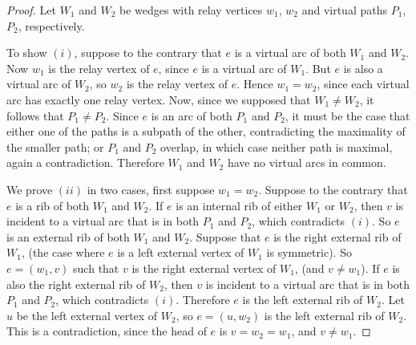 \documentclass[12pt,letterpaper,oneside]{book}
\begin{document}
\begin{proof} 

Let $W_1$ and $W_2$ be wedges with relay vertices $w_1$, $w_2$ 
and virtual paths $P_1$, $P_2$, respectively.   

To show $(i)$, suppose to the contrary that $e$ is a virtual arc of both $W_1$ and $W_2$.   
Now $w_1$ is the relay vertex of $e$, since $e$ is a virtual arc of $W_1$.  But 
$e$ is also a virtual arc of $W_2$, so $w_2$ is the relay vertex of $e$.  Hence $w_1 = w_2$, since 
each virtual arc has exactly one relay vertex.  Now, since we 
supposed that $W_1 \ne W_2$, it follows that $P_1 \ne P_2$.  Since $e$ is an arc of both $P_1$ and $P_2$, it must be the case that  
either one of the paths is a subpath of the other, contradicting the maximality of the smaller path; or $P_1$ and $P_2$ overlap, in  
which case neither path is maximal, again a contradiction. 
Therefore $W_1$ and $W_2$ have no virtual arcs in common. 
 

 
We prove $(ii)$ in two cases, first suppose $w_1= w_2$.  Suppose 
to the contrary that $e$ is a rib of both  
$W_1$ and $W_2$.  If $e$ is an internal 
rib of either $W_1$ or $W_2$, then $v$ is incident to a virtual arc that is in both $P_1$ and $P_2$, which contradicts 
$(i)$.  
So $e$ is an external rib of both $W_1$ and $W_2$.   
Suppose that 
$e$ is the right external rib of $W_1$, (the case 
where $e$ is a left external vertex of $W_1$ is symmetric).  So $e=(w_1,v)$ such that $v$ is the right external vertex  
of $W_1$, (and $v\ne w_1$).  If $e$ is also the right external rib of $W_2$, then $v$ is incident to a virtual arc that is in both 
$P_1$ and $P_2$, which contradicts $(i)$.  Therefore $e$ is the left external rib of $W_2$.  Let $u$ be the left 
external vertex of $W_2$, so $e=(u,w_2)$ is the left external rib of $W_2$.  This is a contradiction, since the head 
of $e$ is $v=w_2=w_1$, and $v\ne w_1$.  





\end{proof}
\end{document}
